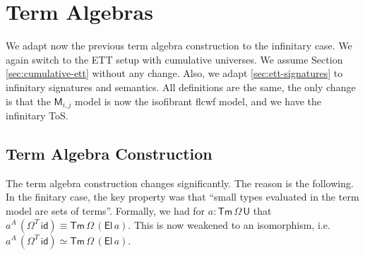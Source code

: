 \documentclass[12pt,a4paper,twoside,openany]{book}
\theoremstyle{remark}
\theoremstyle{definition}
\newtheorem{myexample}{Example}
\theoremstyle{theorem}
\newcommand{\ms}[1]{\mathsf{#1}}
\newcommand{\bs}[1]{\boldsymbol{#1}}
\newcommand{\id}{\mathsf{id}}
\newcommand{\Sub}{\mathsf{Sub}}
\newcommand{\Tm}{\mathsf{Tm}}
\newcommand{\U}{\mathsf{U}}
\newcommand{\El}{\mathsf{El}}
\newcommand{\blank}{\mathord{\hspace{1pt}\text{--}\hspace{1pt}}}
\newcommand{\bM}{\bs{\mathsf{M}}}
\newcommand{\defn}{:\equiv}
\begin{document}


\section{Term Algebras}
\label{sec:inf-term-algebras}

We adapt now the previous term algebra construction to the infinitary
case. We again switch to the ETT setup with cumulative universes. We
assume Section \ref{sec:cumulative-ett} without any change. Also, we adapt
\ref{sec:ett-signatures} to infinitary signatures and semantics. All definitions
are the same, the only change is that the $\bM_{i,j}$ model is now the
isofibrant flcwf model, and we have the infinitary ToS.

\subsection{Term Algebra Construction}
\label{sec:iqii-term-algebra-construction}

The term algebra construction changes significantly. The reason is the
following. In the finitary case, the key property was that ``small types
evaluated in the term model are sets of terms''. Formally, we had for $a :
\Tm\,\Omega\,\U$ that $a^A\,(\Omega^T\,\id) \equiv \Tm\,\Omega\,(\El\,a)$.  This
is now weakened to an isomorphism, i.e.\ $a^A\,(\Omega^T\,\id) \simeq
\Tm\,\Omega\,(\El\,a)$.
\end{document}
